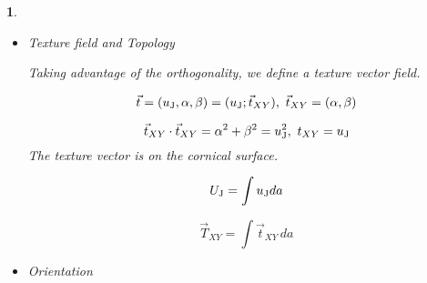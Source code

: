 \documentclass[12pt]{article}
\theoremstyle{problemstyle}
\newtheorem{problem}{}
\begin{document}
\begin{problem}
\begin{itemize}
        It is the component for isotropic variation in spin structure and related to the exchange energy.
        \begin{equation}
            \alpha = \frac{1}{2} \left( Q_{xx}-Q_{yy} \right)= \frac{1}{2} \left( \frac{\partial \vec{S}}{\partial x} \cdot \frac{\partial \vec{S}}{\partial x} 
            - \frac{\partial \vec{S}}{\partial y} \cdot \frac{\partial \vec{S}}{\partial y} \right)
        \end{equation}
        It is the component for vertical or horizontal texture in spin structure. If vertical, it is positive, if horizontal, it is negative. 

        \begin{equation}
            \beta = \frac{1}{2} \left( Q_{xy}+Q_{yx} \right)= \frac{\partial \vec{S}}{\partial x} \cdot \frac{\partial \vec{S}}{\partial y} 
        \end{equation}
        It is the component for diagonal textures in spin structure. The sign is determined with upright or downleft direction.
        
        \item Texture field and Topology 
        
        Taking advantage of the orthogonality, we define a texture vector field.     
        
        \begin{equation}
            \vec{t} = (u_{\rm{J}},\alpha, \beta ) =(u_{\rm{J}}; \vec{t}_{XY} ),\,\, \vec{t}_{XY}= (\alpha, \beta) 
        \end{equation}
        
        \begin{equation}
            \vec{t}_{XY} \cdot \vec{t}_{XY} = \alpha^2 + \beta^2 = u_{\rm{J}}^2, \,\, t_{XY}=u_{\rm{J}}
        \end{equation}
        The texture vector is on the cornical surface.

        \begin{equation}
            U_{\rm{J}} = \int{u_{\rm{J}}} da
        \end{equation}

        \begin{equation}
            \vec{T}_{XY} = \int\vec{t}_{XY} \, da
        \end{equation}
        
        \item Orientation
        

\end{itemize}
\end{problem}
\end{document}
